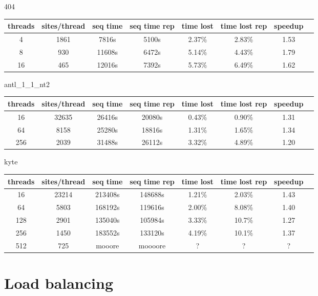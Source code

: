 \documentclass[a4paper]{article}
\begin{document}
404

\begin{tabular}{|c|c|c|c|c|c|c|c|}
\hline threads & sites/thread & seq time & seq time rep & time lost & time lost rep & speedup \\
\hline 4 & 1861 & 7816s & 5100s & 2.37\% & 2.83\% & 1.53 \\
\hline 8 & 930 & 11608s & 6472s & 5.14\% & 4.43\% & 1.79 \\
\hline 16 & 465 & 12016s & 7392s & 5.73\% & 6.49\% & 1.62 \\
\hline
\end{tabular}
\newline


antl\_1\_1\_nt2

\begin{tabular}{|c|c|c|c|c|c|c|c|}
\hline threads & sites/thread & seq time & seq time rep & time lost & time lost rep & speedup \\
\hline 16 & 32635 & 26416s & 20080s & 0.43\% & 0.90\% & 1.31 \\
\hline 64 & 8158 & 25280s & 18816s & 1.31\% & 1.65\% & 1.34 \\
\hline 256 & 2039 & 31488s & 26112s & 3.32\% & 4.89\% & 1.20 \\
\hline
\end{tabular}
\newline


kyte

\begin{tabular}{|c|c|c|c|c|c|c|c|}
\hline threads & sites/thread & seq time & seq time rep & time lost & time lost rep & speedup \\
\hline 16 & 23214 & 213408s & 148688s & 1.21\% & 2.03\% & 1.43 \\
\hline 64 & 5803 & 168192s & 119616s & 2.00\% & 8.08\% & 1.40 \\
\hline 128 & 2901 & 135040s & 105984s & 3.33\% & 10.7\% & 1.27 \\
\hline 256 & 1450 & 183552s & 133120s & 4.19\% & 10.1\% & 1.37 \\
\hline 512 & 725 & mooore & moooore & ? & ? & ?\\
\hline
\end{tabular}
\newline




\section{Load balancing}
\end{document}
